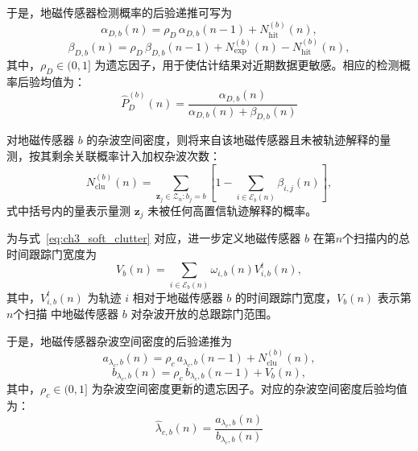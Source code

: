 \documentclass{xdupgthesis}
\begin{document}
于是，地磁传感器检测概率的后验递推可写为
\begin{equation}
	\alpha_{D,b}(n)
	=
	\rho_D\,\alpha_{D,b}(n-1)+N_{\mathrm{hit}}^{(b)}(n),
	\label{eq:ch3_alpha_update}
\end{equation}
\begin{equation}
	\beta_{D,b}(n)
	=
	\rho_D\,\beta_{D,b}(n-1)+N_{\mathrm{exp}}^{(b)}(n)-N_{\mathrm{hit}}^{(b)}(n),
	\label{eq:ch3_beta_update}
\end{equation}
其中，$\rho_D\in(0,1]$ 为遗忘因子，用于使估计结果对近期数据更敏感。相应的检测概率后验均值为：
\begin{equation}
	\hat P_D^{(b)}(n)
	=
	\frac{\alpha_{D,b}(n)}{\alpha_{D,b}(n)+\beta_{D,b}(n)}
	\label{eq:ch3_pD_mean}
\end{equation}

对地磁传感器 $b$ 的杂波空间密度，则将来自该地磁传感器且未被轨迹解释的量测，按其剩余关联概率计入加权杂波次数：
\begin{equation}
	N_{\mathrm{clu}}^{(b)}(n)
	=
	\sum_{\mathbf z_j\in \mathcal Z_n:b_j=b}
	\left[
	1-\sum_{i\in\mathcal E_b(n)}\beta_{i,j}(n)
	\right],
	\label{eq:ch3_soft_clutter}
\end{equation}
式中括号内的量表示量测 $\mathbf z_j$ 未被任何高置信轨迹解释的概率。

为与式~\eqref{eq:ch3_soft_clutter} 对应，进一步定义地磁传感器 $b$ 在第$n$个扫描内的总时间跟踪门宽度为
\begin{equation}
	V_b(n)
	=
	\sum_{i\in\mathcal E_b(n)}
	\omega_{i,b}(n)V^{t}_{i,b}(n),
	\label{eq:ch3_exposure_volume}
\end{equation}
其中，$V^{t}_{i,b}(n)$ 为轨迹 $i$ 相对于地磁传感器 $b$ 的时间跟踪门宽度，$V_b(n)$ 表示第$n$个扫描 中地磁传感器 $b$ 对杂波开放的总跟踪门范围。

于是，地磁传感器杂波空间密度的后验递推为
\begin{equation}
	a_{\lambda_c,b}(n)
	=
	\rho_c\, a_{\lambda_c,b}(n-1)+N_{\mathrm{clu}}^{(b)}(n),
	\label{eq:ch3_a_lambda_update}
\end{equation}
\begin{equation}
	b_{\lambda_c,b}(n)
	=
	\rho_c\, b_{\lambda_c,b}(n-1)+V_b(n),
	\label{eq:ch3_b_lambda_update}
\end{equation}
其中，$\rho_c\in(0,1]$ 为杂波空间密度更新的遗忘因子。对应的杂波空间密度后验均值为：
\begin{equation}
	\hat\lambda_{c,b}(n)
	=
	\frac{a_{\lambda_c,b}(n)}{b_{\lambda_c,b}(n)}
	\label{eq:ch3_kappa_mean_v2}
\end{equation}
\end{document}

